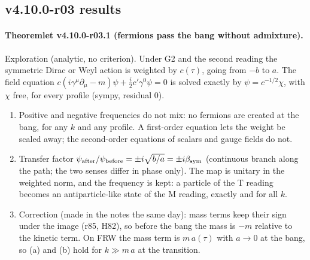 \subsection*{v4.10.0-r03 results}
\label{subsec:v4100-r03-results}

\paragraph{Theoremlet v4.10.0-r03.1 (fermions pass the bang without admixture).}
Exploration (analytic, no criterion).  Under G2 and the second reading the symmetric Dirac or Weyl action is weighted by \(c(\tau)\), going from
\(-b\) to \(a\).  The field equation \(c(i\gamma^\mu\partial_\mu-m)\psi+\tfrac i2c'\gamma^0\psi=0\) is solved exactly by \(\psi=c^{-1/2}\chi\), with \(\chi\) free, for
every profile (sympy, residual \(0\)).
\begin{enumerate}[leftmargin=2em]
\item[(a)] Positive and negative frequencies do not mix: no fermions are created at the bang, for any \(k\) and any profile.  A first-order equation lets
the weight be scaled away; the second-order equations of scalars and gauge fields do not.
\item[(b)] Transfer factor \(\psi_{\rm after}/\psi_{\rm before}=\pm i\sqrt{b/a}=\pm i\beta_{\rm sym}\) (continuous branch along the path; the two senses differ in phase
only).  The map is unitary in the weighted norm, and the frequency is kept: a particle of the T reading becomes an antiparticle-like state of the M
reading, exactly and for all \(k\).
\item[(c)] Correction (made in the notes the same day): mass terms keep their sign under the image (r85, H82), so before the bang the mass is \(-m\)
relative to the kinetic term.  On FRW the mass term is \(m\,a(\tau)\) with \(a\to0\) at the bang, so (a) and (b) hold for \(k\gg m\,a\) at the transition.
\end{enumerate}


